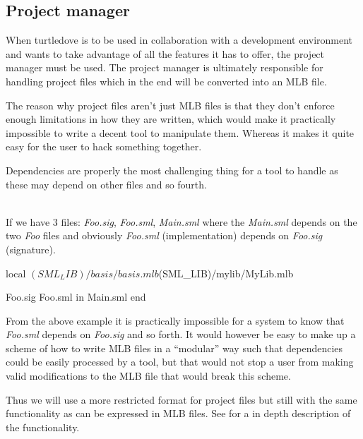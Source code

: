 \subsection{Project manager}
When turtledove is to be used in collaboration with a development environment
and wants to take advantage of all the features it has to offer, the project
manager must be used. The project manager is ultimately responsible for handling
project files which in the end will be converted into an MLB file. 

The reason why project files aren't just MLB files is that they don't enforce
enough limitations in how they are written, which would make it practically
impossible to write a decent tool to manipulate them. Whereas it makes it quite
easy for the user to hack something together.

Dependencies are properly the most challenging thing for a tool to handle as
these may depend on other files and so fourth. 

\begin{example}\ \\
  If we have 3 files: \textit{Foo.sig}, \textit{Foo.sml}, \textit{Main.sml}
  where the \textit{Main.sml} depends on the two \textit{Foo} files and
  obviously \textit{Foo.sml} (implementation) depends on \textit{Foo.sig}
  (signature).

  \begin{sml}
local
  $(SML_LIB)/basis/basis.mlb
  $(SML_LIB)/mylib/MyLib.mlb

  Foo.sig Foo.sml
in
  Main.sml
end    
  \end{sml}
\end{example}

\noindent
From the above example it is practically impossible for a system to know that
\textit{Foo.sml} depends on \textit{Foo.sig} and so forth. It would however be
easy to make up a scheme of how to write MLB files in a ``modular'' way such
that dependencies could be easily processed by a tool, but that would not stop a
user from making valid modifications to the MLB file that would break this
scheme.

Thus we will use a more restricted format for project files but still with the
same functionality as can be expressed in MLB files. See
 for a in depth description of the
functionality.



